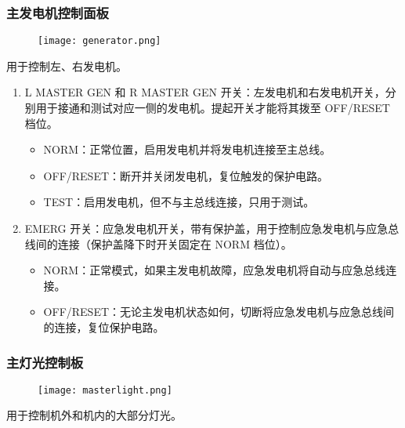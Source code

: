 \subsubsection{主发电机控制面板}

\begin{figure}[htb]
	\centering
	\texttt{[image: generator.png]}
\end{figure}
用于控制左、右发电机。

\begin{enumerate}
	\item L MASTER GEN 和 R MASTER GEN 开关：左发电机和右发电机开关，分别用于接通和测试对应一侧的发电机。提起开关才能将其拨至 OFF/RESET 档位。
	      \begin{itemize}
		      \item NORM：正常位置，启用发电机并将发电机连接至主总线。
		      \item OFF/RESET：断开并关闭发电机，复位触发的保护电路。
		      \item TEST：启用发电机，但不与主总线连接，只用于测试。
	      \end{itemize}
	\item EMERG 开关：应急发电机开关，带有保护盖，用于控制应急发电机与应急总线间的连接（保护盖降下时开关固定在 NORM 档位）。
	      \begin{itemize}
		      \item NORM：正常模式，如果主发电机故障，应急发电机将自动与应急总线连接。
		      \item OFF/RESET：无论主发电机状态如何，切断将应急发电机与应急总线间的连接，复位保护电路。
	      \end{itemize}
\end{enumerate}

\subsubsection{主灯光控制板}

\begin{figure}[htb]
	\centering
	\texttt{[image: masterlight.png]}
\end{figure}
用于控制机外和机内的大部分灯光。

